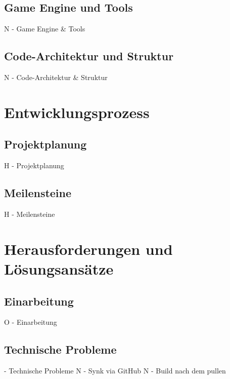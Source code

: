 \documentclass[oneside]{ausarbeitung}
\begin{document}
\section{Game Engine und Tools}

N - Game Engine & Tools


\section{Code-Architektur und Struktur}

N - Code-Architektur & Struktur


\chapter{Entwicklungsprozess}

\section{Projektplanung}

H - Projektplanung


\section{Meilensteine}

H - Meilensteine



\chapter{Herausforderungen und Lösungsansätze}

\section{Einarbeitung}

O - Einarbeitung


\section{Technische Probleme}

  - Technische Probleme
N   - Synk via GitHub
N   - Build nach dem pullen
\end{document}
